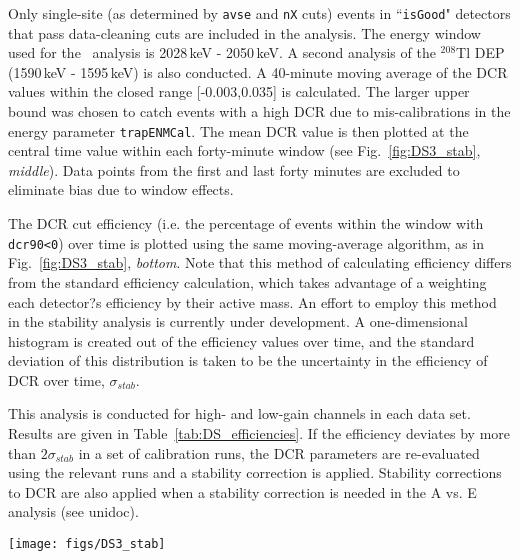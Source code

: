\documentclass[groupedaddress,rmp,amsmath,amssymb,bibnotes,altaffilletter,twocolumn]{revtex4-1}
\begin{document}
Only single-site (as determined by {\tt avse} and {\tt nX} cuts) events in ``{\tt isGood}" detectors that pass data-cleaning cuts are included in the analysis. The energy window used for the \nonubb\ analysis is 2028\,keV - 2050\,keV. A second analysis of the $^{208}$Tl DEP (1590\,keV - 1595\,keV) is also conducted. A 40-minute moving average of the DCR values within the closed range [-0.003,0.035] is calculated. The larger upper bound was chosen to catch events with a high DCR due to mis-calibrations in the energy parameter {\tt trapENMCal}. The mean DCR value is then plotted at the central time value within each forty-minute window (see Fig.~\ref{fig:DS3_stab}, {\it middle}). Data points from the first and last forty minutes are excluded to eliminate bias due to window effects. 

The DCR cut efficiency (i.e.  the percentage of events within the window with {\tt dcr90<0}) over time is plotted using the same moving-average algorithm, as in Fig.~\ref{fig:DS3_stab}, {\it bottom}. Note that this method of calculating efficiency differs from the standard efficiency calculation, which takes advantage of a weighting each detector?s efficiency by their active mass.  An effort to employ this method in the stability analysis is currently under development. A one-dimensional histogram is created out of the efficiency values over time, and the standard deviation of this distribution is taken to be the uncertainty in the efficiency of DCR over time, $\sigma_{stab}$. 

This analysis is conducted for high- and low-gain channels in each data set. Results are given in Table~\ref{tab:DS_efficiencies}. If the efficiency deviates by more than $2\sigma_{stab}$ in a set of calibration runs, the DCR parameters are re-evaluated using the relevant runs and a stability correction is applied. Stability corrections to DCR are also applied when a stability correction is needed in the A vs. E analysis (see unidoc).

\begin{figure*}[t]
 \centering
 \texttt{[image: figs/DS3\_stab]}
 \caption{Stability study results for DS3 high-gain channels. The middle and bottom figures are calculated using a 40-minute moving average; in these plots the filled dashed region indicates the uncertainty in each value, taken as the standard deviation of the value's distribution in a given time window. The magenta lines indicate the mean of the plotted values. {\it Top:} DCR values for all events passing cuts. {\it Middle:} The central value of DCR over time. {\it Bottom:} The bulk acceptance of the DCR cut over time. The vertical lines indicate the runtime boundaries of the long calibration run used to set the DCR cut, and the blue line indicates the average efficiency in this time window.} 
 \label{fig:DS3_stab}
\end{figure*}
\end{document}
